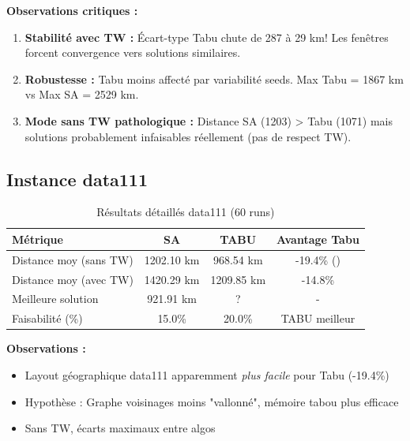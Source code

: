 \documentclass[12pt,a4paper,twoside]{report}
\begin{document}
\textbf{Observations critiques :}

\begin{enumerate}
    \item \textbf{Stabilité avec TW :} Écart-type Tabu chute de 287 à 29 km! Les fenêtres forcent convergence vers solutions similaires.

    \item \textbf{Robustesse :} Tabu moins affecté par variabilité seeds. Max Tabu = 1867 km vs Max SA = 2529 km.

    \item \textbf{Mode sans TW pathologique :} Distance SA (1203) > Tabu (1071) mais solutions probablement infaisables réellement (pas de respect TW).
\end{enumerate}

\subsection{Instance data111}

\begin{table}[H]
    \centering
    \caption{Résultats détaillés data111 (60 runs)}
    \begin{tabular}{|l|c|c|c|}
        \hline
        \textbf{Métrique}      & \textbf{SA} & \textbf{TABU} & \textbf{Avantage Tabu} \\
        \hline
        Distance moy (sans TW) & 1202.10 km  & 968.54 km     & -19.4\% (\!)           \\
        Distance moy (avec TW) & 1420.29 km  & 1209.85 km    & -14.8\%                \\
        Meilleure solution     & 921.91 km   & ?             & -                      \\
        Faisabilité (\%)       & 15.0\%      & 20.0\%        & TABU meilleur          \\
        \hline
    \end{tabular}
\end{table}

\textbf{Observations :}

\begin{itemize}
    \item Layout géographique data111 apparemment \textit{plus facile} pour Tabu
          (-19.4\%)
    \item Hypothèse : Graphe voisinages moins "vallonné", mémoire tabou plus efficace
    \item Sans TW, écarts maximaux entre algos
\end{itemize}
\end{document}
